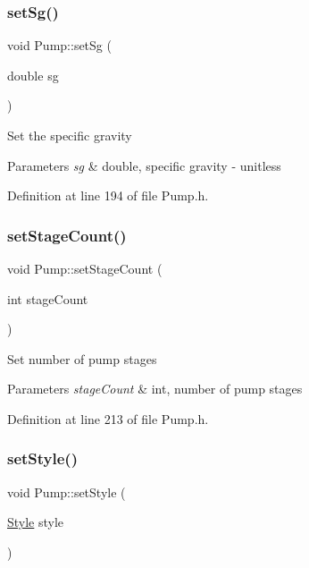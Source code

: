 \subsubsection{\texorpdfstring{set\+Sg()}{setSg()}}
{\footnotesize\ttfamily void Pump\+::set\+Sg (\begin{DoxyParamCaption}\item[{double}]{sg }\end{DoxyParamCaption})\hspace{0.3cm}{\ttfamily [inline]}}

Set the specific gravity


\begin{DoxyParams}{Parameters}
{\em sg} & double, specific gravity -\/ unitless \\
\hline
\end{DoxyParams}


Definition at line 194 of file Pump.\+h.

\mbox{\label{class_pump_a28943405616a792c970b7e9bbf01c1b2}} 
\subsubsection{\texorpdfstring{set\+Stage\+Count()}{setStageCount()}}
{\footnotesize\ttfamily void Pump\+::set\+Stage\+Count (\begin{DoxyParamCaption}\item[{int}]{stage\+Count }\end{DoxyParamCaption})\hspace{0.3cm}{\ttfamily [inline]}}

Set number of pump stages


\begin{DoxyParams}{Parameters}
{\em stage\+Count} & int, number of pump stages \\
\hline
\end{DoxyParams}


Definition at line 213 of file Pump.\+h.

\mbox{\label{class_pump_a4852cb47f40a46ba84c7dff91d1abd53}} 
\subsubsection{\texorpdfstring{set\+Style()}{setStyle()}}
{\footnotesize\ttfamily void Pump\+::set\+Style (\begin{DoxyParamCaption}\item[{\hyperlink{class_pump_aef354601ce4218258cc898b35a1e90ff}{Style}}]{style }\end{DoxyParamCaption})\hspace{0.3cm}{\ttfamily [inline]}}

